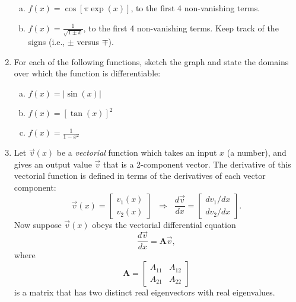 \documentclass[10pt,a4paper]{article}
\begin{document}
\begin{enumerate}
\begin{enumerate}[(a)]
  \item
    $f(x) = \cos\left[\pi\exp(x)\right]$, to the first 4 non-vanishing
    terms.

  \item
    $\displaystyle f(x) = \frac{1}{\sqrt{1 \pm x}}$, to the first 4
    non-vanishing terms. Keep track of the signs (i.e., $\pm$ versus
    $\mp$).
  \end{enumerate}

\item
  For each of the following functions, sketch the graph and state the
  domains over which the function is differentiable:

  \begin{enumerate}[(a)]
  \item
    $f(x) = |\sin(x)|$

  \item
    $f(x) = \left[\tan(x)\right]^2$

  \item
    $\displaystyle f(x) = \frac{1}{1-x^2}$
  \end{enumerate}

\item
  Let $\vec{v}(x)$ be a \emph{vectorial} function which takes an input
  $x$ (a number), and gives an output value $\vec{v}$ that is a
  2-component vector. The derivative of this vectorial function is
  defined in terms of the derivatives of each vector component:
  \begin{equation}
    \vec{v}(x) = \begin{bmatrix}v_1(x) \\ v_2(x)\end{bmatrix}
    \;\; \Rightarrow \;\; \frac{d\vec{v}}{dx} = \begin{bmatrix}dv_1/dx \\
      dv_2/dx\end{bmatrix}.
  \end{equation}
  Now suppose $\vec{v}(x)$ obeys the vectorial differential equation
  \begin{equation}
    \frac{d\vec{v}}{dx} = \mathbf{A} \vec{v},
  \end{equation}
  where
  \begin{equation}
    \mathbf{A} = \begin{bmatrix}A_{11} & A_{12} \\ A_{21} & A_{22}\end{bmatrix}
  \end{equation}
  is a matrix that has two distinct real eigenvectors with real
  eigenvalues.


\end{enumerate}
\end{document}
